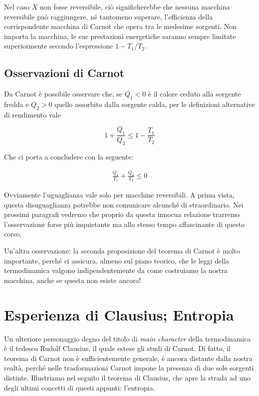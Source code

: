 Nel caso $X$ non fosse reversibile, ciò significherebbe che
nessuna macchina reversibile può raggiungere, né tantomeno
superare, l'efficienza della corrispondente macchina di Carnot
che opera tra le medesime sorgenti. Non importa la macchina,
le sue prestazioni energetiche saranno sempre limitate superiormente
secondo l'espressione $1 - T_1/T_2$.

\subsection{Osservazioni di Carnot}
Da Carnot è possibile osservare che, se $Q_1 < 0$ è il calore ceduto
alla sorgente fredda e $Q_2 > 0$ quello assorbito dalla sorgente
calda, per le definizioni alternative di rendimento vale

\[ 1 + \frac{Q_1}{Q_2} \leq 1 - \frac{T_1}{T_2} \]

\noindent Che ci porta a concludere con la seguente:

\begin{align}
    \frac{Q_1}{T_1} + \frac{Q_2}{T_2} \leq 0
\end{align}

\noindent Ovviamente l'uguaglianza vale solo per macchine reversibili.
A prima vista, questa disuguaglianza potrebbe non comunicare
alcunché di straordinario. Nei prossimi paragrafi vedremo che
proprio da questa innocua relazione trarremo l'osservazione
forse più inquietante ma allo stesso tempo affascinante di
questo corso.

Un'altra osservazione: la seconda proposizione del teorema di Carnot
è molto importante, perché ci assicura, almeno sul piano teorico, che
le leggi della termodinamica valgono indipendentemente da come costruiamo
la nostra macchina, anche se questa non esiste ancora!

\section[Clausius; Entropia]{Esperienza di Clausius; Entropia}
Un ulteriore personaggio degno del titolo di \textit{main character}
della termodinamica è il tedesco Rudolf Clausius, il quale estese
gli studi di Carnot. Di fatto, il teorema di Carnot non è sufficientemente
generale, è ancora distante dalla nostra realtà, perché nelle trasformazioni
Carnot impone la presenza di due sole sorgenti distinte. Illustriamo nel seguito
il teorema di Clausius, che apre la strada ad uno degli ultimi concetti di questi
appunti: l'entropia.

